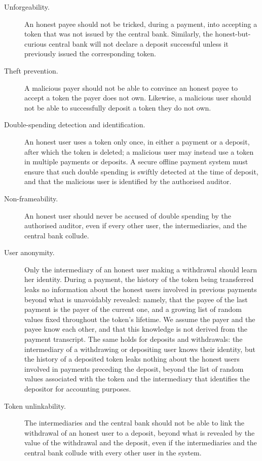 \begin{description}

  \item[Unforgeability.] An honest payee should not be tricked, during a
    payment, into accepting a token that was not issued by the central bank.
    Similarly, the honest-but-curious central bank will not declare a deposit
    successful unless it previously issued the corresponding token.

  \item[Theft prevention.] A malicious payer should not be able to convince an
    honest payee to accept a token the payer does not own. Likewise, a
    malicious user should not be able to successfully deposit a token they do
    not own.

  \item[Double-spending detection and identification.] An honest user uses a
    token only once, in either a payment or a deposit, after which the token is
    deleted; a malicious user may instead use a token in multiple payments or
    deposits. A secure offline payment system must ensure that such double
    spending is swiftly detected at the time of deposit, and that the malicious
    user is identified by the authorised auditor.

  \item[Non-frameability.] An honest user should never be accused of double
    spending by the authorised auditor, even if every other user, the
    intermediaries, and the central bank collude.

  \item[User anonymity.] Only the intermediary of an honest user making a
    withdrawal should learn her identity. During a payment, the history of the
    token being transferred leaks no information about the honest users
    involved in previous payments beyond what is unavoidably revealed: namely,
    that the payee of the last payment is the payer of the current one, and a
    growing list of random values fixed throughout the token's lifetime. We
    assume the payer and the payee know each other, and that this knowledge is
    not derived from the payment transcript. The same holds for deposits and
    withdrawals: the intermediary of a withdrawing or depositing user knows
    their identity, but the history of a deposited token leaks nothing about
    the honest users involved in payments preceding the deposit, beyond the
    list of random values associated with the token and the intermediary that
    identifies the depositor for accounting purposes.

  \item[Token unlinkability.] The intermediaries and the central bank should
    not be able to link the withdrawal of an honest user to a deposit, beyond
    what is revealed by the value of the withdrawal and the deposit, even if
    the intermediaries and the central bank collude with every other user in
    the system.

\end{description}

